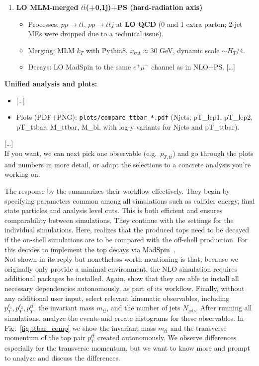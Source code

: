 \documentclass[submission, Phys]{SciPost}
\begin{document}
\begin{promptblock}
\begin{enumerate}
  \item \textbf{LO MLM-merged $t\bar t$(+0,1j)+PS (hard-radiation axis)}
  \begin{itemize}
    \item Processes: $pp \to t\bar t$, $pp \to t\bar t j$ at \textbf{LO QCD} (0 and 1 extra parton; 2-jet MEs were dropped due to a technical issue).
    \item Merging: MLM $k_T$ with Pythia8, $x_{\text{cut}} \approx 30$ GeV, dynamic scale $\sim H_T/4$.
    \item Decays: LO MadSpin to the same $e^+\mu^-$ channel as in NLO+PS. [\ldots]
  \end{itemize}
\end{enumerate}

\textbf{Unified analysis and plots:}
\begin{itemize}
  \item {[\ldots]}
  \item Plots (PDF+PNG): \texttt{plots/compare\_ttbar\_*.pdf} (Njets, pT\_lep1, pT\_lep2, pT\_ttbar, M\_ttbar, M\_bl, with log-y variants for Njets and pT\_ttbar).
\end{itemize}

[\ldots]\\
If you want, we can next pick one observable (e.g.\ $p_{T,t\bar t}$) and go through the plots and numbers in more detail, or adapt the selections to a concrete analysis you’re working on.
\end{promptblock}
%
The response by the \ma summarizes their workflow effectively. They begin by specifying parameters common among all simulations such as collider energy, final state particles and analysis level cuts.
This is both efficient and ensures comparability between simulations. 
They continue with the settings for the individual simulations. Here, \ma realizes that the produced tops need to be decayed if the on-shell simulations are to be compared with the off-shell production. For this \ma decides to implement the top decays via MadSpin~\cite{Artoisenet:2012st}.\\
Not shown in its reply but nonetheless worth mentioning is that, because we originally only provide a minimal \mg environment, the NLO simulation requires additional packages be installed. Again, \ma show that they are able to install all necessary dependencies autonomously, as part of its workflow.
Finally, without any additional user input, \ma select relevant kinematic observables, including $p_{T}^{\ell_1},p_{T}^{\ell_2},p_{T}^{t\bar{t}}$, the invariant mass $m_{t\bar{t}}$, and the number of jets $N_\text{jets}$. After running all simulations, \ma analyze the events and create histograms for these observables.
In Fig.~\ref{fig:ttbar_comp} we show the invariant mass $m_{t\bar{t}}$ and the transverse momentum of the top pair $p_{T}^{t\bar{t}}$ created autonomously.  We observe differences especially for the transverse momentum, but we want to know more and prompt \ma to analyze and discuss the differences.
\end{document}

